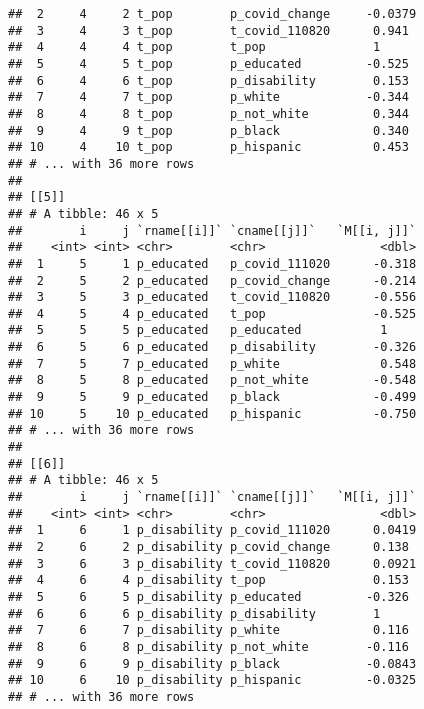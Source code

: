 \documentclass[
]{article}
\newenvironment{Shaded}{\begin{snugshade}}{\end{snugshade}}
\newcommand{\KeywordTok}[1]{\textcolor[rgb]{0.13,0.29,0.53}{\textbf{#1}}}
\newcommand{\NormalTok}[1]{#1}
\newcommand{\OperatorTok}[1]{\textcolor[rgb]{0.81,0.36,0.00}{\textbf{#1}}}
\newcommand{\StringTok}[1]{\textcolor[rgb]{0.31,0.60,0.02}{#1}}
\begin{document}
\begin{verbatim}
##  2     4     2 t_pop        p_covid_change     -0.0379
##  3     4     3 t_pop        t_covid_110820      0.941 
##  4     4     4 t_pop        t_pop               1     
##  5     4     5 t_pop        p_educated         -0.525 
##  6     4     6 t_pop        p_disability        0.153 
##  7     4     7 t_pop        p_white            -0.344 
##  8     4     8 t_pop        p_not_white         0.344 
##  9     4     9 t_pop        p_black             0.340 
## 10     4    10 t_pop        p_hispanic          0.453 
## # ... with 36 more rows
## 
## [[5]]
## # A tibble: 46 x 5
##        i     j `rname[[i]]` `cname[[j]]`   `M[[i, j]]`
##    <int> <int> <chr>        <chr>                <dbl>
##  1     5     1 p_educated   p_covid_111020      -0.318
##  2     5     2 p_educated   p_covid_change      -0.214
##  3     5     3 p_educated   t_covid_110820      -0.556
##  4     5     4 p_educated   t_pop               -0.525
##  5     5     5 p_educated   p_educated           1    
##  6     5     6 p_educated   p_disability        -0.326
##  7     5     7 p_educated   p_white              0.548
##  8     5     8 p_educated   p_not_white         -0.548
##  9     5     9 p_educated   p_black             -0.499
## 10     5    10 p_educated   p_hispanic          -0.750
## # ... with 36 more rows
## 
## [[6]]
## # A tibble: 46 x 5
##        i     j `rname[[i]]` `cname[[j]]`   `M[[i, j]]`
##    <int> <int> <chr>        <chr>                <dbl>
##  1     6     1 p_disability p_covid_111020      0.0419
##  2     6     2 p_disability p_covid_change      0.138 
##  3     6     3 p_disability t_covid_110820      0.0921
##  4     6     4 p_disability t_pop               0.153 
##  5     6     5 p_disability p_educated         -0.326 
##  6     6     6 p_disability p_disability        1     
##  7     6     7 p_disability p_white             0.116 
##  8     6     8 p_disability p_not_white        -0.116 
##  9     6     9 p_disability p_black            -0.0843
## 10     6    10 p_disability p_hispanic         -0.0325
## # ... with 36 more rows
\end{verbatim}

\begin{Shaded}
\end{Shaded}
\end{document}

